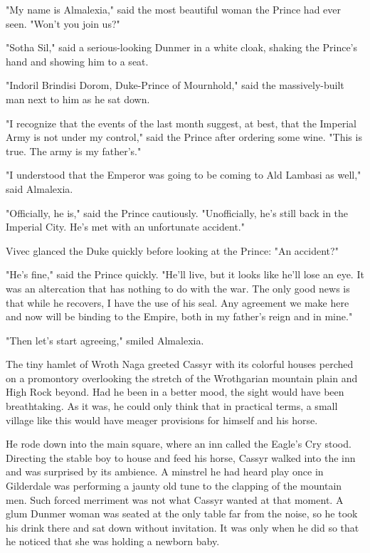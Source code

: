 "My name is Almalexia," said the most beautiful woman the Prince had ever seen. "Won't you join us?"

"Sotha Sil," said a serious-looking Dunmer in a white cloak, shaking the Prince's hand and showing him to a seat.

"Indoril Brindisi Dorom, Duke-Prince of Mournhold," said the massively-built man next to him as he sat down.

"I recognize that the events of the last month suggest, at best, that the Imperial Army is not under my control," said the Prince after ordering some wine. "This is true. The army is my father's."

"I understood that the Emperor was going to be coming to Ald Lambasi as well," said Almalexia.

"Officially, he is," said the Prince cautiously. "Unofficially, he's still back in the Imperial City. He's met with an unfortunate accident."

Vivec glanced the Duke quickly before looking at the Prince: "An accident?"

"He's fine," said the Prince quickly. "He'll live, but it looks like he'll lose an eye. It was an altercation that has nothing to do with the war. The only good news is that while he recovers, I have the use of his seal. Any agreement we make here and now will be binding to the Empire, both in my father's reign and in mine."

"Then let's start agreeing," smiled Almalexia.

The tiny hamlet of Wroth Naga greeted Cassyr with its colorful houses perched on a promontory overlooking the stretch of the Wrothgarian mountain plain and High Rock beyond. Had he been in a better mood, the sight would have been breathtaking. As it was, he could only think that in practical terms, a small village like this would have meager provisions for himself and his horse.

He rode down into the main square, where an inn called the Eagle's Cry stood. Directing the stable boy to house and feed his horse, Cassyr walked into the inn and was surprised by its ambience. A minstrel he had heard play once in Gilderdale was performing a jaunty old tune to the clapping of the mountain men. Such forced merriment was not what Cassyr wanted at that moment. A glum Dunmer woman was seated at the only table far from the noise, so he took his drink there and sat down without invitation. It was only when he did so that he noticed that she was holding a newborn baby.

